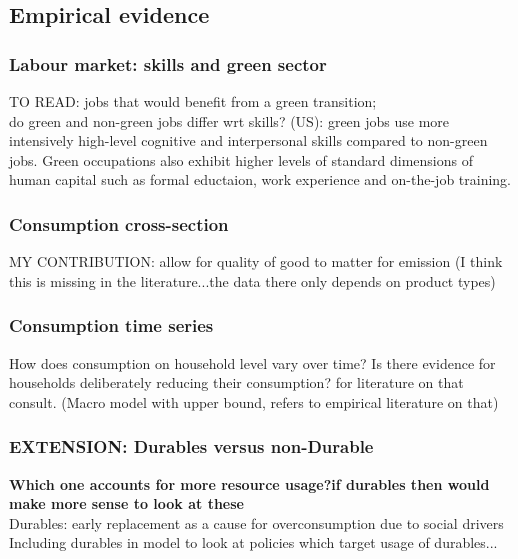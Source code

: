 \subsection{Empirical evidence}
\subsubsection{Labour market: skills and green sector}
TO READ: \cite{Bowen2018CharacterisingComposition} jobs that would benefit from a green transition; \\
\cite{Consoli2016DoCapital} do green and non-green jobs differ wrt skills? (US): green jobs use more intensively high-level cognitive and interpersonal skills compared to non-green jobs. Green occupations also exhibit higher levels of standard dimensions of human capital such as formal eductaion, work experience and on-the-job training. 

\subsubsection{Consumption cross-section }
MY CONTRIBUTION: allow for quality of good to matter for emission (I think this is missing in the literature...the data there only depends on product types)

\subsubsection{Consumption time series}
How does consumption on household level vary over time? Is there evidence for households deliberately reducing their consumption? 
\ar for literature on that consult. \cite{Heikkinen2015DegrowthConsumers} (Macro model with upper bound, refers to empirical literature on that)

\subsubsection{EXTENSION: Durables versus non-Durable}
\textbf{Which one accounts for more resource usage?\ar if durables then would make more sense to look at these}
\\
Durables: early replacement as a cause for overconsumption due to social drivers \citep{Hou2020FeelingsIntentions}
\\ 
Including durables in model to look at policies which target usage of durables...
